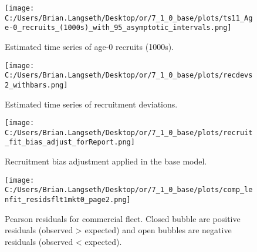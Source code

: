 \documentclass[11pt,
  english,
  a4paper,
]{article}
\begin{document}
\tagmcend\tagstructend


\begin{figure}
\centering
\texttt{[image: C:/Users/Brian.Langseth/Desktop/or/7\_1\_0\_base/plots/ts11\_Age-0\_recruits\_(1000s)\_with\_95\_asymptotic\_intervals.png]}
\caption{Estimated time series of age-0 recruits (1000s).\label{fig:recruits}}
\end{figure}

\tagmcend\tagstructend


\begin{figure}
\centering
\texttt{[image: C:/Users/Brian.Langseth/Desktop/or/7\_1\_0\_base/plots/recdevs2\_withbars.png]}
\caption{Estimated time series of recruitment deviations.\label{fig:rec-devs}}
\end{figure}

\tagmcend\tagstructend


\begin{figure}
\centering
\texttt{[image: C:/Users/Brian.Langseth/Desktop/or/7\_1\_0\_base/plots/recruit\_fit\_bias\_adjust\_forReport.png]}
\caption{Recruitment bias adjustment applied in the base model.\label{fig:bias-adj}}
\end{figure}

\tagmcend\tagstructend


\begin{figure}
\centering
\texttt{[image: C:/Users/Brian.Langseth/Desktop/or/7\_1\_0\_base/plots/comp\_lenfit\_residsflt1mkt0\_page2.png]}
\caption{Pearson residuals for commercial fleet. Closed bubble are positive residuals (observed \textgreater{} expected) and open bubbles are negative residuals (observed \textless{} expected).\label{fig:com-pearson}}
\end{figure}
\end{document}
